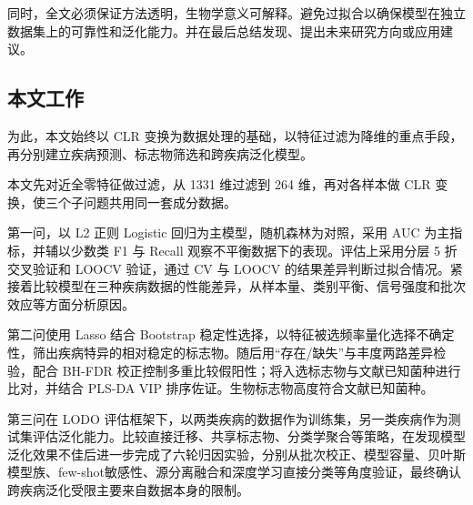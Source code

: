 同时，全文必须保证方法透明，生物学意义可解释。避免过拟合以确保模型在独立数据集上的可靠性和泛化能力。并在最后总结发现、提出未来研究方向或应用建议。

\subsection{本文工作}

为此，本文始终以 CLR 变换为数据处理的基础，以特征过滤为降维的重点手段，再分别建立疾病预测、标志物筛选和跨疾病泛化模型。

本文先对近全零特征做过滤，从 1331 维过滤到 264 维，再对各样本做 CLR 变换，使三个子问题共用同一套成分数据。

第一问，以 L2 正则 Logistic 回归为主模型，随机森林为对照，采用 AUC 为主指标，并辅以少数类 F1 与 Recall 观察不平衡数据下的表现。评估上采用分层 5 折交叉验证和 LOOCV 验证，通过 CV 与 LOOCV 的结果差异判断过拟合情况。紧接着比较模型在三种疾病数据的性能差异，从样本量、类别平衡、信号强度和批次效应等方面分析原因。

第二问使用 Lasso 结合 Bootstrap 稳定性选择，以特征被选频率量化选择不确定性，筛出疾病特异的相对稳定的标志物。随后用“存在/缺失”与丰度两路差异检验，配合 BH-FDR 校正控制多重比较假阳性；将入选标志物与文献已知菌种进行比对，并结合 PLS-DA VIP 排序佐证。生物标志物高度符合文献已知菌种。

第三问在 LODO 评估框架下，以两类疾病的数据作为训练集，另一类疾病作为测试集评估泛化能力。比较直接迁移、共享标志物、分类学聚合等策略，在发现模型泛化效果不佳后进一步完成了六轮归因实验，分别从批次校正、模型容量、贝叶斯模型族、few-shot敏感性、源分离融合和深度学习直接分类等角度验证，最终确认跨疾病泛化受限主要来自数据本身的限制。

